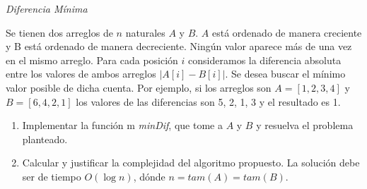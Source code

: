 \begin{enunciado}{}

  \textit{Diferencia Mínima}

     Se tienen dos arreglos de $n$ naturales $A$ y $B$. $A$ está ordenado de manera creciente y B está ordenado de
    manera decreciente. Ningún valor aparece más de una vez en el mismo arreglo. Para cada posición $i$ consideramos
    la diferencia absoluta entre los valores de ambos arreglos $|A[i]-B[i]|$. Se desea buscar el mínimo valor posible
    de dicha cuenta. Por ejemplo, si los arreglos son $A = [1, 2, 3, 4]$ y $B = [6, 4, 2, 1]$ los valores de las diferencias son
    5, 2, 1, 3 y el resultado es 1.

  \begin{enumerate}[label=\arabic*.]
    \item Implementar la función m \textit{minDif}, que tome a $A$ y $B$ y resuelva el problema planteado.

    \item Calcular y justificar la complejidad del algoritmo propuesto. La solución debe ser de tiempo $O(\log n)$,
        dónde $n = tam(A) = tam(B)$.     
  \end{enumerate}
\end{enunciado}

